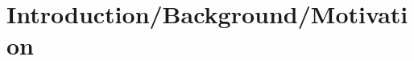 \documentclass[../AdvancementSummary.tex]{subfiles}
\begin{document}
\section{Introduction/Background/Motivation}

%
%
%
%
\end{document}

